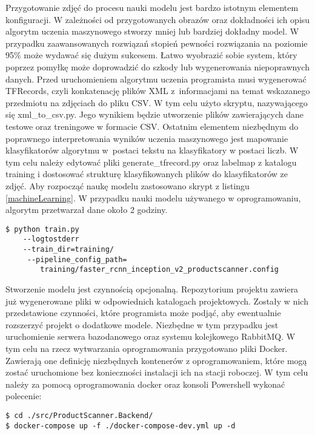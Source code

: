 Przygotowanie zdjęć do procesu nauki modelu jest bardzo istotnym elementem konfiguracji. W zależności od przygotowanych obrazów oraz dokładności ich opisu algorytm uczenia maszynowego stworzy mniej lub bardziej dokładny model. W przypadku zaawansowanych rozwiązań stopień pewności rozwiązania na poziomie 95\% może wydawać się dużym sukcesem. Łatwo wyobrazić sobie system, który poprzez pomyłkę może doprowadzić do szkody lub wygenerowania niepoprawnych danych. Przed uruchomieniem algorytmu uczenia programista musi wygenerować TFRecords, czyli konkatenację plików XML z~informacjami na temat wskazanego przedmiotu na zdjęciach do pliku CSV. W tym celu użyto skryptu, nazywającego się xml\_to\_csv.py. Jego wynikiem będzie utworzenie plików zawierających dane testowe oraz treningowe w formacie CSV. Ostatnim elementem niezbędnym do poprawnego interpretowania wyników uczenia maszynowego jest mapowanie klasyfikatorów algorytmu w~postaci tekstu na klasyfikatory w postaci liczb. W tym celu należy edytować pliki generate\_tfrecord.py oraz labelmap z katalogu training i dostosować strukturę klasyfikowanych plików do klasyfikatorów ze zdjęć. Aby rozpocząć naukę modelu zastosowano skrypt z listingu \ref{machineLearning}. W przypadku nauki modelu używanego w oprogramowaniu, algorytm przetwarzał dane około 2 godziny. 

\begin{lstlisting}[caption={Uruchomienie algorytmu uczenia maszynowego.}, label={machineLearning} ]
$ python train.py 
	--logtostderr 
	--train_dir=training/
	 --pipeline_config_path=
	 	training/faster_rcnn_inception_v2_productscanner.config
\end{lstlisting}


Stworzenie modelu jest czynnością opcjonalną. Repozytorium projektu zawiera już wygenerowane pliki w odpowiednich katalogach projektowych. Zostały w nich  przedstawione czynności, które programista może podjąć, aby ewentualnie rozszerzyć projekt o dodatkowe modele. Niezbędne w tym przypadku jest uruchomienie serwera bazodanowego oraz systemu kolejkowego RabbitMQ. W tym celu na rzecz wytwarzania oprogramowania przygotowano pliki Docker. Zawierają one definicję niezbędnych kontenerów z oprogramowaniem, które mogą zostać uruchomione bez konieczności instalacji ich na stacji roboczej. W tym celu należy za pomocą oprogramowania docker oraz konsoli Powershell wykonać polecenie:

\begin{lstlisting}[caption={Uruchomienie kontenerów docker.} ]
$ cd ./src/ProductScanner.Backend/
$ docker-compose up -f ./docker-compose-dev.yml up -d
\end{lstlisting}

